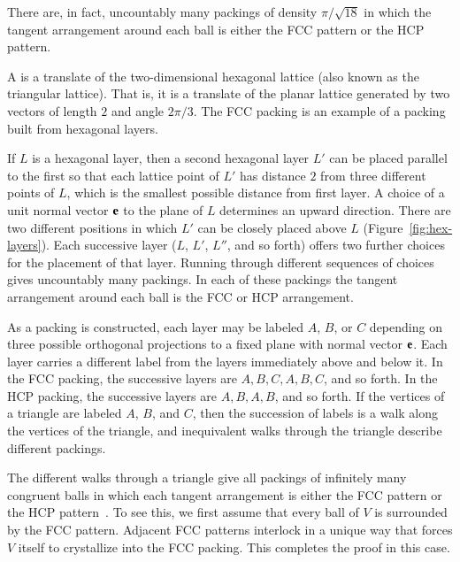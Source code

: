 \figSGIWBEN %

There are, in fact, uncountably many packings of density
$\pi/\sqrt{18}$ in which the tangent arrangement around each ball is
either the FCC pattern or the HCP pattern.

A  is a translate of the
two-dimensional hexagonal lattice (also known as the triangular
lattice). That is, it is a translate of the planar lattice generated
by two vectors of length $2$ and angle $2\pi/3$.  The FCC
 packing is an example of a packing built from hexagonal layers.

 If $L$ is a hexagonal layer, then a second hexagonal layer $L'$ can be
 placed parallel to the first so that each lattice point of $L'$ has
 distance $2$ from three different points of $L$,
 which is the smallest possible distance from first layer.  A choice
 of a unit normal vector ${\mathbf e}$ to the plane of $L$ determines an upward
 direction.  There are two different positions in which $L'$ can be
 closely placed above $L$
(Figure~\ref{fig:hex-layers}).  Each successive layer 
  ($L$, $L'$, $L''$, and so
 forth) offers two further choices  for the placement of
 that layer. Running through different 
 sequences of choices gives uncountably many packings.  In each of
 these packings the tangent arrangement around each ball is the FCC or HCP arrangement.

\figCCQCYWU %

As a packing is constructed, each layer may be labeled
$A$, $B$, or $C$ depending on three possible orthogonal projections to a fixed plane
with normal vector ${\mathbf e}$.
Each layer carries a different label from the layers immediately
above and below it.  In the FCC packing, the successive layers are
$A,B,C,A,B,C$, and so forth.  In the HCP packing, the successive layers are
$A,B,A,B$, and so forth.  If the vertices of a triangle are labeled $A$, $B$, and $C$,
then the succession of labels is a
walk along the vertices of the triangle, and inequivalent walks through the
triangle describe different packings.


The different walks through a triangle give all packings of infinitely
many congruent balls in which each tangent arrangement is
either the FCC pattern  or the HCP pattern~\cite{CoSl95}.  To see
this, we first assume that every ball of $V$ is surrounded by the FCC pattern.  
Adjacent FCC patterns interlock in a unique way
that forces $V$ itself to crystallize into the
FCC packing.  This completes the proof in this case.

